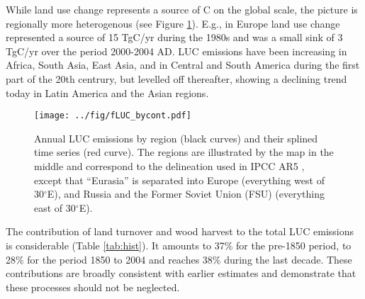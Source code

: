 While land use change represents a source of C on the global scale, the picture is regionally more heterogenous (see Figure \ref{fig:fluc.bycont}). E.g., in Europe land use change represented a source of 15 TgC/yr during the 1980s and was a small sink of 3 TgC/yr over the period 2000-2004 AD. LUC emissions have been increasing in Africa, South Asia, East Asia, and in Central and South America during the first part of the 20th centrury, but levelled off thereafter, showing a declining trend today in Latin America and the Asian regions.
\begin{figure}
 \noindent
 \texttt{[image: ../fig/fLUC\_bycont.pdf]}
 \caption[Annual LUC emissions by region]{Annual LUC emissions by region (black curves) and their splined time series (red curve). The regions are illustrated by the map in the middle and correspond to the delineation used in IPCC AR5 \citep{ciais13ipcc}, except that ``Eurasia'' is separated into Europe (everything west of 30$^{\circ}$E), and Russia and the Former Soviet Union (FSU) (everything east of 30$^{\circ}$E).}
\label{fig:fluc.bycont}
\end{figure}


The contribution of land turnover and wood harvest to the total LUC emissions is considerable (Table \ref{tab:hist}). It amounts to 37\% for the pre-1850 period, to 28\% for the period 1850 to 2004 and reaches 38\% during the last decade. These contributions are broadly consistent with earlier estimates \citep{olofssonhickler2008,shevliakova09gbc} and demonstrate that these processes should not be neglected. 

